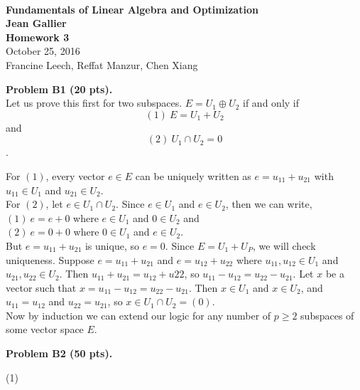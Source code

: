 \documentclass[12pt]{article}
\begin{document}
\begin{center}
\\
\vspace{1cm}
{\Large\bf Fundamentals of Linear Algebra and Optimization\\
Jean Gallier \\
\vspace{0.5cm}
Homework 3}\\[10pt]
October 25, 2016\\
Francine Leech, Reffat Manzur, Chen Xiang \\
\end{center}


\vspace {0.25cm}\noindent
{\bf Problem B1 (20 pts).} \\
Let us prove this first for two subspaces. $E = U_1 \oplus U_2$ if and only if $$ (1)\ E = U_1  + U_2$$ and $$(2)\ U_1 \cap U_2 = {0}$$. 

For $(1)$, every vector $e \in E$ can be uniquely written as $e = u_{11} + u_{21}$ with $u_{11} \in U_1$ and $u_{21} \in U_2$. \\

For $(2)$, let $e \in U_1 \cap U_2$. Since $e \in U_1$ and $e \in U_2$, then we can write, \\

$(1)\ e = e + 0$ where $e \in U_1$ and $0 \in U_2$ and  \\

$(2)\ e = 0 + 0$ where $0 \in U_1$ and $e \in U_2$.  \\ 

But $e = u_{11} + u_{21}$ is unique, so $e=0$. Since $E = U_1 + U_P$, we will check uniqueness. Suppose $e = u_{11} + u_{21}$ and $e = u_{12} + u_{22}$ where $u_{11} , u_{12}  \in U_1$ and $u_{21} , u_{22}  \in U_2$. Then $u_{11} + u_{21} = u_{12} + u{22}$, so $u_{11} - u_{12} = u_{22} - u_{21}$.  Let $x$ be a vector such that $x = u_{11} - u_{12} = u_{22} - u_{21}$. Then $x \in U_1$ and $x \in U_2$, and $u_{11} = u_{12}$ and $u_{22} = u_{21}$, so $x \in U_1 \cap U_2 = (0)$. \\

Now by induction we can extend our logic for any number of $p\geq 2$  subspaces of some vector space $E$. 



\vspace {0.25cm}\noindent
{\bf Problem B2 (50 pts).}

\medskip
(1)\\
\end{document}
